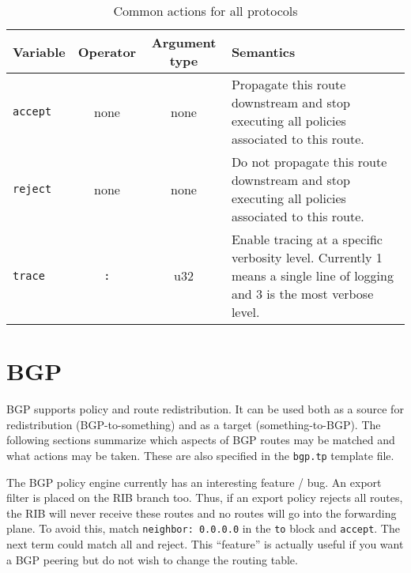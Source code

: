 \begin{table}[h]
\centering
\begin{tabular}{|l|c|c|p{9cm}|}
\hline
Variable & Operator & Argument type & Semantics \\
\hline\hline
{\tt accept} & none & none & Propagate this route downstream and stop executing
all policies associated to this route.\\
{\tt reject} & none & none & Do not propagate this route downstream and stop executing
all policies associated to this route.\\
\hline
{\tt trace} & {\tt :} & u32 & Enable tracing at a specific verbosity level.
Currently 1 means a single line of logging and 3 is the most verbose level. \\
\hline
\end{tabular}
\caption{\label{policy_common_action}Common actions for all protocols}
\end{table}

\section{BGP}
BGP supports policy and route redistribution.  It can be used both as a source
for redistribution (BGP-to-something) and as a target (something-to-BGP).  The
following sections summarize which aspects of BGP routes may be matched and what
actions may be taken. These are also specified in the {\tt bgp.tp} template file.

The BGP policy engine currently has an interesting feature / bug.  An export
filter is placed on the RIB branch too.  Thus, if an export policy rejects all
routes, the RIB will never receive these routes and no routes will go into the
forwarding plane.  To avoid this, match {\tt neighbor: 0.0.0.0} in the {\tt to}
block and {\tt accept}.  The next term could match all and reject.  This
``feature'' is actually useful if you want a BGP peering but do not wish to
change the routing table.

